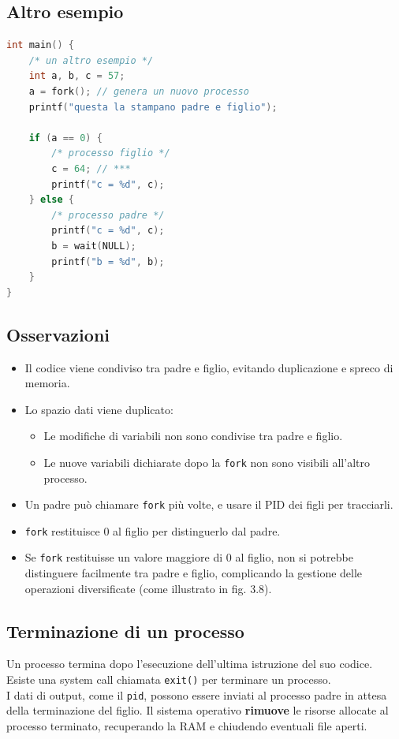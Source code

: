 \subsection{Altro esempio}
\begin{lstlisting}[language=C]
int main() {
    /* un altro esempio */
    int a, b, c = 57;
    a = fork(); // genera un nuovo processo
    printf("questa la stampano padre e figlio");
    
    if (a == 0) {
        /* processo figlio */
        c = 64; // ***
        printf("c = %d", c);
    } else {
        /* processo padre */
        printf("c = %d", c);
        b = wait(NULL);
        printf("b = %d", b);
    }
}
\end{lstlisting}
\subsection{Osservazioni}
\begin{itemize}
    \item Il codice viene condiviso tra padre e figlio, evitando duplicazione e spreco di memoria.
    \item Lo spazio dati viene duplicato: 
    \begin{itemize}
        \item Le modifiche di variabili non sono condivise tra padre e figlio.
        \item Le nuove variabili dichiarate dopo la \texttt{fork} non sono visibili all'altro processo.
    \end{itemize}
    \item Un padre può chiamare \texttt{fork} più volte, e usare il PID dei figli per tracciarli.
    \item \texttt{fork} restituisce 0 al figlio per distinguerlo dal padre.
    \item Se \texttt{fork} restituisse un valore maggiore di 0 al figlio, non si potrebbe distinguere facilmente tra padre e figlio, complicando la gestione delle operazioni diversificate (come illustrato in fig. 3.8).
\end{itemize}

\subsection{Terminazione di un processo}
Un processo termina dopo l'esecuzione dell'ultima istruzione del suo codice. Esiste una system call chiamata \texttt{exit()} per terminare un processo. \\
I dati di output, come il \texttt{pid}, possono essere inviati al processo padre in attesa della terminazione del figlio.
Il sistema operativo \textbf{rimuove} le risorse allocate al processo terminato, recuperando la RAM e chiudendo eventuali file aperti.

